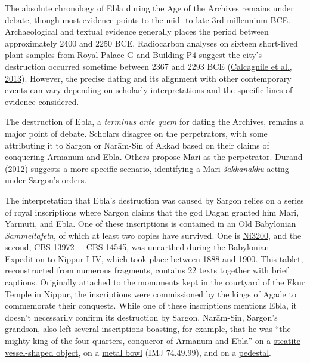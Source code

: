 \documentclass[
]{book}
\begin{document}
The absolute chronology of Ebla during the Age of the Archives remains under debate, though most evidence points to the mid- to late-3rd millennium BCE. Archaeological and textual evidence generally places the period between approximately 2400 and 2250 BCE. Radiocarbon analyses on sixteen short-lived plant samples from Royal Palace G and Building P4 suggest the city's destruction occurred sometime between 2367 and 2293 BCE (\protect\hyperlink{ref-CalcagnileEtAl2013}{Calcagnile et al., 2013}). However, the precise dating and its alignment with other contemporary events can vary depending on scholarly interpretations and the specific lines of evidence considered.

The destruction of Ebla, a \emph{terminus ante quem} for dating the Archives, remains a major point of debate. Scholars disagree on the perpetrators, with some attributing it to Sargon or Narām-Sîn of Akkad based on their claims of conquering Armanum and Ebla. Others propose Mari as the perpetrator. Durand (\protect\hyperlink{ref-Durand2012}{2012}) suggests a more specific scenario, identifying a Mari \emph{šakkanakku} acting under Sargon's orders.

The interpretation that Ebla's destruction was caused by Sargon relies on a series of royal inscriptions where Sargon claims that the god Dagan granted him Mari, Yarmuti, and Ebla. One of these inscriptions is contained in an Old Babylonian \emph{Sammeltafeln}, of which at least two copies have survived. One is \href{https://cdli.mpiwg-berlin.mpg.de/artifacts/227510}{Ni3200}, and the second, \href{https://www.penn.museum/collections/object/347461}{CBS 13972 + CBS 14545}, was unearthed during the Babylonian Expedition to Nippur I-IV, which took place between 1888 and 1900. This tablet, reconstructed from numerous fragments, contains 22 texts together with brief captions. Originally attached to the monuments kept in the courtyard of the Ekur Temple in Nippur, the inscriptions were commissioned by the kings of Agade to commemorate their conquests. While one of these inscriptions mentions Ebla, it doesn't necessarily confirm its destruction by Sargon. Narām-Sîn, Sargon's grandson, also left several inscriptions boasting, for example, that he was ``the mighty king of the four quarters, conqueror of Armānum and Ebla'' on a \href{https://www.carmentis.be/eMP/eMuseumPlus?service=ExternalInterface\&module=collection\&objectId=87396\&viewType=detailView}{steatite vessel-shaped object}, on a \href{https://cdli.mpiwg-berlin.mpg.de/artifacts/216630}{metal bowl} (IMJ 74.49.99), and on a \href{https://collections.louvre.fr/en/ark:/53355/cl010121772}{pedestal}.
\end{document}

